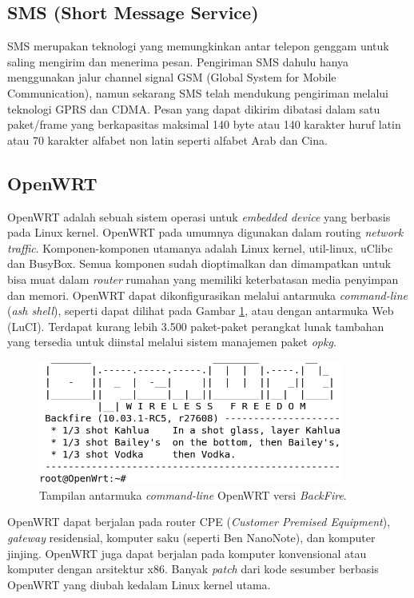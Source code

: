 \documentclass{jtetiproposalskripsi}
\begin{document}
\subsection{SMS (Short Message Service)}
SMS merupakan teknologi yang memungkinkan antar telepon genggam untuk saling mengirim dan menerima pesan. Pengiriman SMS dahulu hanya menggunakan jalur channel signal GSM (Global System for Mobile Communication), namun sekarang SMS telah mendukung pengiriman melalui teknologi GPRS dan CDMA. Pesan yang dapat dikirim dibatasi dalam satu paket/frame yang berkapasitas maksimal 140 byte atau 140 karakter huruf latin atau 70 karakter alfabet non latin seperti alfabet Arab dan Cina.


\subsection{OpenWRT}
OpenWRT adalah sebuah sistem operasi untuk \emph{embedded device} yang berbasis pada Linux kernel. OpenWRT pada umumnya digunakan dalam routing \emph{network traffic}. Komponen-komponen utamanya adalah Linux kernel, util-linux, uClibc dan BusyBox. Semua komponen sudah dioptimalkan dan dimampatkan untuk bisa muat dalam \emph{router} rumahan yang memiliki keterbatasan media penyimpan dan memori. OpenWRT dapat dikonfigurasikan melalui antarmuka \emph{command-line} (\emph{ash shell}), seperti dapat dilihat pada Gambar \ref{openwrt}, atau dengan antarmuka Web (LuCI). Terdapat kurang lebih 3.500 paket-paket perangkat lunak tambahan yang tersedia untuk diinstal melalui sistem manajemen paket \emph{opkg}.

\begin{figure}[ht!]
  \centering
    \includegraphics[width=10cm]{gambar/openwrt}
    \caption{Tampilan antarmuka \emph{command-line} OpenWRT versi \emph{BackFire}.}
    \label{openwrt}
\end{figure}

OpenWRT dapat berjalan pada router CPE (\emph{Customer Premised Equipment}), \emph{gateway} residensial, komputer saku (seperti Ben NanoNote), dan komputer jinjing. OpenWRT juga dapat berjalan pada komputer konvensional atau komputer dengan arsitektur x86. Banyak \emph{patch} dari kode sesumber berbasis OpenWRT yang diubah kedalam Linux kernel utama.
\end{document}
